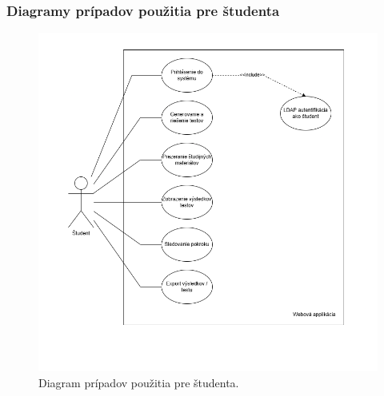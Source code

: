 \subsubsection*{Diagramy prípadov použitia pre študenta}
\begin{figure}[H]
  \centering
  \includegraphics[width=16cm]{img/diagram_student.png}
  \caption{Diagram prípadov použitia pre študenta.}
  \label{studentdiagram}
\end{figure}




